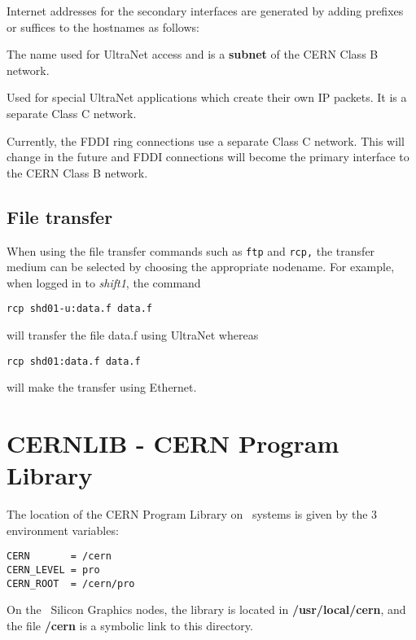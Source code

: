 Internet addresses for the secondary interfaces
are generated by adding prefixes or suffices to the hostnames as follows:
\begin{Lentry}
\item [hostname-u]
The name used for UltraNet access and is a {\bf subnet} of the
CERN Class B network.
\item[hostname-uip]
Used for special UltraNet applications which create their own IP packets.
It is a separate Class C network.
\item[f-hostname]
Currently, the FDDI ring connections use a separate Class C network.
This will change in the future and FDDI connections will become
the primary interface to the CERN Class B network.
\end{Lentry}
 
\subsection {File transfer}
 
When using the file transfer commands such as
{\tt ftp} and {\tt rcp,}
the transfer medium can be selected by choosing the appropriate nodename.
For example, when logged in to {\it shift1}, the command
 
\begin{center}
{\tt rcp shd01-u:data.f  data.f}
\end{center}
 
will transfer the file data.f using UltraNet whereas
 
\begin{center}
{\tt rcp shd01:data.f  data.f}
\end{center}
 
will make the transfer using Ethernet.
 
\section{CERNLIB - CERN Program Library}
 
The location of the CERN Program Library on \shift\ systems is given
by the 3 environment variables:
 
\begin{verbatim}
CERN       = /cern
CERN_LEVEL = pro
CERN_ROOT  = /cern/pro
\end{verbatim}
 
On the \shift\ Silicon Graphics nodes, the library is located in {\bf
 /usr/local/cern},
and the file {\bf /cern} is a symbolic link to this directory.
 
